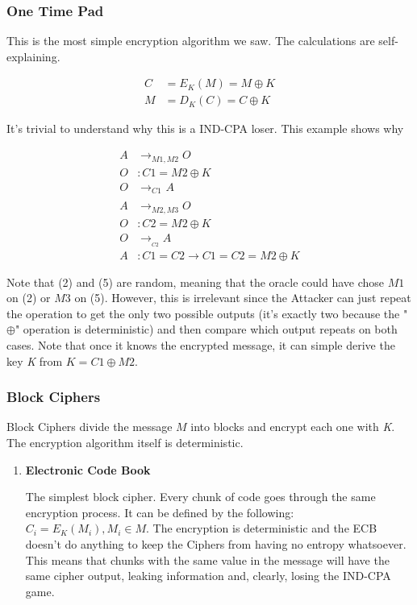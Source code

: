 \documentclass[11pt]{article}
\begin{document}
\subsubsection{One Time Pad}
\label{sec:org84f5efc}
This is the most simple encryption algorithm we saw. The calculations are self-explaining.

\begin{align*}
C &= E_K(M) = M \oplus K \\
M &= D_K(C) = C \oplus K
\end{align*}

It's trivial to understand why this is a IND-CPA loser. This example shows why

\begin{align}
A &\to_{M1,M2} O \\
O &: C1 = M2 \oplus K \\
O &\to_{C1}_{}_{} A \\
A &\to_{M2,M3} O \\
O &: C2 = M2 \oplus K \\
O &\to_{}_{C2} A \\
A &: C1 = C2 \to C1 = C2 = M2 \oplus K
\end{align}

Note that (2) and (5) are random, meaning that the oracle could have chose \(M1\) on (2) or \(M3\) on (5). However, this is irrelevant since the Attacker can just repeat the operation to get the only two possible outputs (it's exactly two because the "\(\oplus\)" operation is deterministic) and then compare which output repeats on both cases. Note that once it knows the encrypted message, it can simple derive the key \emph{K} from \(K = C1 \oplus M2\).
\subsubsection{Block Ciphers}
\label{sec:org0befc4a}
Block Ciphers divide the message \(M\) into blocks and encrypt each one with \emph{K}. The encryption algorithm itself is deterministic.
\begin{enumerate}
\item \textbf{Electronic Code Book}
\label{sec:org5cf3648}

The simplest block cipher. Every chunk of code goes through the same encryption process. It can be defined by the following: \(C_i = E_K(M_i), M_i \in M\). The encryption is deterministic and the ECB doesn't do anything to keep the Ciphers from having no entropy whatsoever. This means that chunks with the same value in the message will have the same cipher output, leaking information and, clearly, losing the IND-CPA game.
\end{enumerate}
\end{document}
